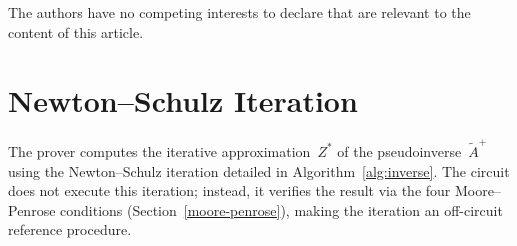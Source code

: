 \documentclass[runningheads]{llncs}
\begin{document}
\begin{credits}
\subsubsection{\discintname}
The authors have no competing interests to declare that are relevant to the content of this article.
\end{credits}




\appendix

\section{Newton--Schulz Iteration}
\label{appx:newton-schulz}

The prover computes the iterative approximation~$Z^{*}$ of the pseudoinverse~$\tilde{A}^{+}$ using the Newton--Schulz iteration detailed in Algorithm~\ref{alg:inverse}. The circuit does not execute this iteration; instead, %
it verifies the result via the four Moore--Penrose conditions (Section~\ref{moore-penrose}), making the iteration an off-circuit reference procedure.

\begin{algorithm}[H]
\raggedright
{}
\caption{Compute Moore--Penrose inverse}
\label{alg:inverse}
\end{algorithm}
\end{document}
